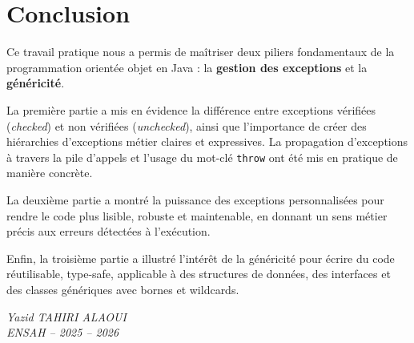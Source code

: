 \documentclass[a4paper,12pt]{report}
\newcommand{\docAuthor}{Yazid TAHIRI ALAOUI}
\newcommand{\docYear}{2025 -- 2026}
\begin{document}



\renewcommand{\thechapter}{\Roman{chapter}}


\newpage
\renewcommand{\contentsname}{Table des matières}
\tableofcontents
\newpage

\setcounter{page}{1}
\renewcommand{\thechapter}{\arabic{chapter}}
\setcounter{chapter}{0}





\chapter*{Conclusion}

Ce travail pratique nous a permis de maîtriser deux piliers fondamentaux de la programmation orientée objet en Java : la \textbf{gestion des exceptions} et la \textbf{généricité}.

La première partie a mis en évidence la différence entre exceptions vérifiées (\textit{checked}) et non vérifiées (\textit{unchecked}), ainsi que l'importance de créer des hiérarchies d'exceptions métier claires et expressives. La propagation d'exceptions à travers la pile d'appels et l'usage du mot-clé \texttt{throw} ont été mis en pratique de manière concrète.

La deuxième partie a montré la puissance des exceptions personnalisées pour rendre le code plus lisible, robuste et maintenable, en donnant un sens métier précis aux erreurs détectées à l'exécution.

Enfin, la troisième partie a illustré l'intérêt de la généricité pour écrire du code réutilisable, type-safe, applicable à des structures de données, des interfaces et des classes génériques avec bornes et wildcards.

\vspace{2cm}
\begin{flushright}
\textit{\docAuthor}\\
\textit{ENSAH -- \docYear}
\end{flushright}
\end{document}
